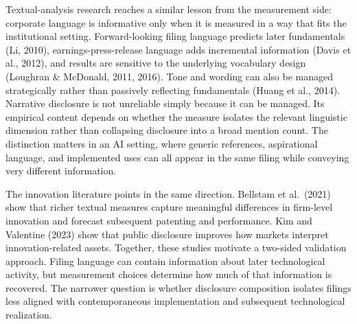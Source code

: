 Textual-analysis research reaches a similar lesson from the measurement side: corporate language is informative only when it is measured in a way that fits the institutional setting. Forward-looking filing language predicts later fundamentals (Li, 2010), earnings-press-release language adds incremental information (Davis et al., 2012), and results are sensitive to the underlying vocabulary design (Loughran \& McDonald, 2011, 2016). Tone and wording can also be managed strategically rather than passively reflecting fundamentals (Huang et al., 2014). Narrative disclosure is not unreliable simply because it can be managed. Its empirical content depends on whether the measure isolates the relevant linguistic dimension rather than collapsing disclosure into a broad mention count. The distinction matters in an AI setting, where generic references, aspirational language, and implemented uses can all appear in the same filing while conveying very different information.

The innovation literature points in the same direction. Bellstam et al.~(2021) show that richer textual measures capture meaningful differences in firm-level innovation and forecast subsequent patenting and performance. Kim and Valentine (2023) show that public disclosure improves how markets interpret innovation-related assets. Together, these studies motivate a two-sided validation approach. Filing language can contain information about later technological activity, but measurement choices determine how much of that information is recovered. The narrower question is whether disclosure composition isolates filings less aligned with contemporaneous implementation and subsequent technological realization.

